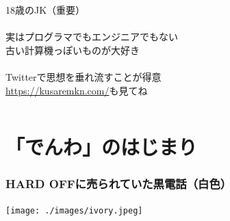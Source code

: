 \documentclass[
  lualatex,
  aspectratio=169,
  14pt
]{beamer}
\begin{document}
\begin{frame}
\begin{columns}
\begin{column}{0.69\textwidth}
      \newlength{\zeropeke}
      \settowidth{\zeropeke}{\tiny 0x}
      \hspace{-\zeropeke}{\tiny 0x}18\nobreak 歳のJK（重要）
      \\~\\[-.5\baselineskip]

      実はプログラマでもエンジニアでもない\\
      \hspace{1.5\zw}古い計算機っぽいものが大好き
      \\~\\[-.5\baselineskip]

      Twitterで思想を垂れ流すことが得意\\
      \hspace{1.5\zw}\url{https://kusaremkn.com/}も見てね
    \end{column}
  \end{columns}
\end{frame}

\section{「でんわ」のはじまり}

\begin{frame}
  \frametitle{HARD OFFに売られていた黒電話（白色）}

  \centering
  \texttt{[image: ./images/ivory.jpeg]}
\end{frame}
\end{document}
